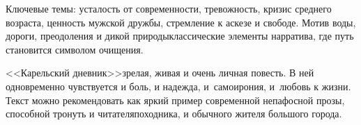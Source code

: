 {\small%
		

Ключевые темы: усталость от современности, тревожность, кризис среднего возраста, ценность мужской дружбы, стремление к аскезе и свободе. Мотив воды, дороги, преодоления и дикой природы\mdash классические элементы нарратива, где путь становится символом очищения.


<<Карельский дневник>>\mdash зрелая, живая и очень личная повесть. В ней одновременно чувствуется и боль, и надежда, и~самоирония, и~любовь к жизни. Текст можно рекомендовать как яркий пример современной непафосной прозы, способной тронуть и читателя\sdash походника, и обычного жителя большого города.
	
}

\vspace{\fill}
\noindent
\begin{minipage}[t]{0.2\textwidth}
	\raggedright ~
\end{minipage}
\hfill
\begin{minipage}[t]{0.8\textwidth}
\end{minipage}
\clearpage

